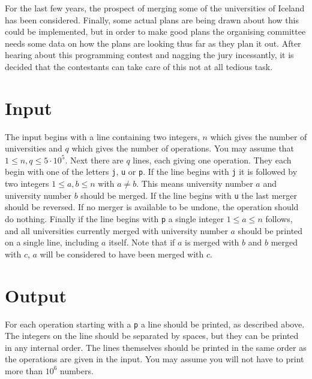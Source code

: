 
For the last few years, the prospect of merging some of the
universities of Iceland has been considered. Finally,
some actual plans are being drawn about how this could be
implemented, but in order to make good plans the organising committee
needs some data on how the plans are looking thus far as
they plan it out. After hearing about this programming contest
and nagging the jury incessantly, it is decided that the
contestants can take care of this not at all tedious task.

\section*{Input}

The input begins with a line containing two integers, $n$
which gives the number of universities and $q$ which gives
the number of operations. 
You may assume that $1 \leq n, q \leq 5 \cdot 10^5$.
Next there are $q$ lines, each giving one operation.
They each begin with one of the letters \texttt{j},
\texttt{u} or \texttt{p}. If the line begins with 
\texttt{j} it is followed by two integers $1 \leq a, b
\leq n$ with $a \neq b$. This means university number $a$
and university number $b$ should be merged. If the line
begins with \texttt{u} the last merger should be reversed.
If no merger is available to be undone, the operation should
do nothing.
Finally if the line begins with \texttt{p} a single integer
$1 \leq a \leq n$ follows, and all universities currently
merged with university number $a$ should be printed
on a single line, including $a$ itself. Note that if $a$ is merged with $b$
and $b$ merged with $c$, $a$ will be considered to have
been merged with $c$.

\section*{Output}

For each operation starting with a \texttt{p} a line
should be printed, as described above. The integers on
the line should be separated by spaces, but they can be
printed in any internal order. The lines themselves should
be printed in the same order as the operations are given in
the input.
You may assume you will not have to print more than $10^6$
numbers.
